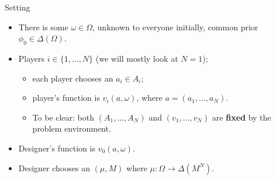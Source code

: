 \documentclass[english,10pt
,aspectratio=169
]{beamer}
\begin{document}
\begin{frame}{Setting}
\begin{itemize}
	\item There is some  $\omega \in \Omega$, unknown to everyone initially, common prior $\phi_0 \in \varDelta(\Omega)$.
	\item \alert{Players} $i \in \{1,...,N\}$ (we will mostly look at $N=1$);
	\begin{itemize}
		\item each player chooses an  $a_i \in A_i$;
		\item player's  function is $v_i(a, \omega)$, where $a = (a_1, ..., a_N)$.
		\item To be clear: both $(A_1,...,A_N)$ and $(v_1,...,v_N)$ are \textbf{fixed} by the problem environment.
	\end{itemize}
	\item \alert{Designer's}  function is $v_0(a, \omega)$.
	\item Designer chooses an  $(\mu,M)$ where $\mu: \Omega \to \varDelta(M^N)$.
\end{itemize}
\end{frame}
\end{document}
